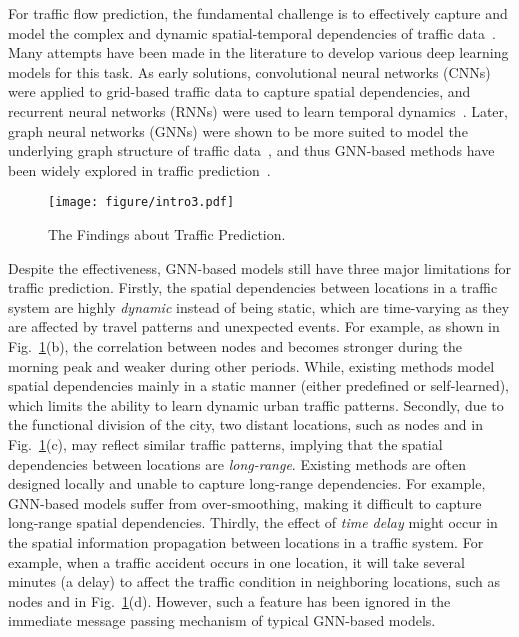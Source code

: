 \documentclass[letterpaper]{article} \usepackage{aaai23}  \usepackage{times}  \usepackage{helvet}  \usepackage{courier}  \usepackage[hyphens]{url}  \usepackage{graphicx} \urlstyle{rm} \def\UrlFont{\rm}  \usepackage{natbib}  \usepackage{caption} \frenchspacing  \setlength{\pdfpagewidth}{8.5in} \setlength{\pdfpageheight}{11in} \usepackage{algorithm}
\begin{document}
For traffic flow prediction, the fundamental challenge is to effectively capture and model the complex and dynamic spatial-temporal dependencies of traffic data~\cite{intro3}. Many attempts have been made in the literature to develop various deep learning models for this task. As early solutions, convolutional neural networks (CNNs) were applied to grid-based traffic data to capture spatial dependencies, and recurrent neural networks (RNNs) were used to learn temporal dynamics~\cite{STResNet, dmvstnet}. Later, graph neural networks (GNNs) were shown to be more suited to model the underlying graph structure of traffic data~\cite{DCRNN, STGCN}, and thus GNN-based methods have been widely explored in traffic prediction~\cite{GWNET,STSGCN,MTGNN,STFGNN,STGODE,STG-NCDE}. 




\begin{figure}[t]
    \centering
    \texttt{[image: figure/intro3.pdf]}
    \caption{The Findings about Traffic Prediction.}
    \label{fig:intro}
\end{figure}





Despite the effectiveness, GNN-based models still have three major limitations for traffic prediction. Firstly, the spatial dependencies between locations in a traffic system are highly \emph{dynamic} instead of being static, which are time-varying as they are affected by travel patterns and unexpected events. For example, as shown in Fig.~\ref{fig:intro}(b), the correlation between nodes  and  becomes stronger during the morning peak and weaker during other periods. While, existing methods model spatial dependencies mainly in a static manner (either predefined or self-learned), which limits the ability to learn dynamic urban traffic patterns. Secondly, due to the functional division of the city, two distant locations, such as nodes  and  in Fig.~\ref{fig:intro}(c), may reflect similar traffic patterns, implying that the spatial dependencies between locations are \emph{long-range}. Existing methods are often designed locally and unable to capture long-range dependencies. For example, GNN-based models suffer from over-smoothing, making it difficult to capture long-range spatial dependencies. Thirdly, the effect of \emph{time delay} might occur in the spatial information propagation between locations in a traffic system. For example, when a traffic accident occurs in one location, it will take several minutes (a delay) to affect the traffic condition in neighboring locations, such as nodes  and  in Fig.~\ref{fig:intro}(d). However, such a feature has been ignored in the immediate message passing mechanism of typical GNN-based models.
\end{document}
